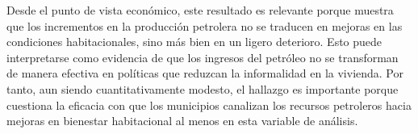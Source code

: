 \documentclass[
]{article}
\begin{document}
Desde el punto de vista económico, este resultado es relevante porque
muestra que los incrementos en la producción petrolera no se traducen en
mejoras en las condiciones habitacionales, sino más bien en un ligero
deterioro. Esto puede interpretarse como evidencia de que los ingresos
del petróleo no se transforman de manera efectiva en políticas que
reduzcan la informalidad en la vivienda. Por tanto, aun siendo
cuantitativamente modesto, el hallazgo es importante porque cuestiona la
eficacia con que los municipios canalizan los recursos petroleros hacia
mejoras en bienestar habitacional al menos en esta variable de análisis.
\end{document}
